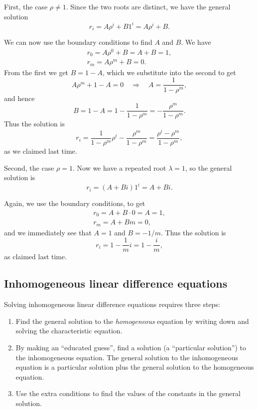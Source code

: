 \documentclass[
  a4paper,
]{article}
\providecommand{\tightlist}{%
  \setlength{\itemsep}{0pt}\setlength{\parskip}{0pt}}
\theoremstyle{definition}
\theoremstyle{definition}
\theoremstyle{definition}
\theoremstyle{remark}
\begin{document}
First, the case \(\rho \neq 1\). Since the two roots are distinct, we have the general solution
\[ r_i = A\rho^i + B1^i = A\rho^i + B . \]

We can now use the boundary conditions to find \(A\) and \(B\). We have
\begin{gather*} r_0 = A \rho^0 + B = A+B = 1, \\
                r_m = A \rho^m + B = 0 . \end{gather*}
From the first we get \(B = 1-A\), which we substitute into the second to get
\[ A\rho^m + 1 - A = 0 \quad \Rightarrow \quad A = \frac{1}{1-\rho^m} , \]
and hence
\[ B = 1 - A = 1 - \frac{1}{1-\rho^m} = - \frac{\rho^m}{1 - \rho^m} . \]
Thus the solution is
\[ r_i = \frac{1}{1-\rho^m} \rho^i -  \frac{\rho^m}{1 - \rho^m} = \frac{\rho^i - \rho^m}{1 - \rho^m}  , \]
as we claimed last time.

Second, the case \(\rho = 1\). Now we have a repeated root \(\lambda = 1\), so the general solution is
\[ r_i = (A + Bi) 1^i = A+Bi . \]

Again, we use the boundary conditions, to get
\begin{gather*} r_0 = A + B\cdot 0 = A = 1, \\
r_m = A + Bm = 0 , \end{gather*}
and we immediately see that \(A = 1\) and \(B = -1/m\). Thus the solution is
\[ r_i = 1 - \frac{1}{m}i = 1 - \frac{i}{m} , \]
as claimed last time.

\hypertarget{inhom-ldes}{%
\subsection{Inhomogeneous linear difference equations}\label{inhom-ldes}}

Solving inhomogeneous linear difference equations requires three steps:

\begin{enumerate}
\def\labelenumi{\arabic{enumi}.}
\tightlist
\item
  Find the general solution to the \emph{homogeneous} equation by writing down and solving the characteristic equation.
\item
  By making an ``educated guess'', find a solution (a ``particular solution'') to the inhomogeneous equation. The general solution to the inhomogeneous equation is a particular solution plus the general solution to the homogeneous equation.
\item
  Use the extra conditions to find the values of the constants in the general solution.
\end{enumerate}
\end{document}
